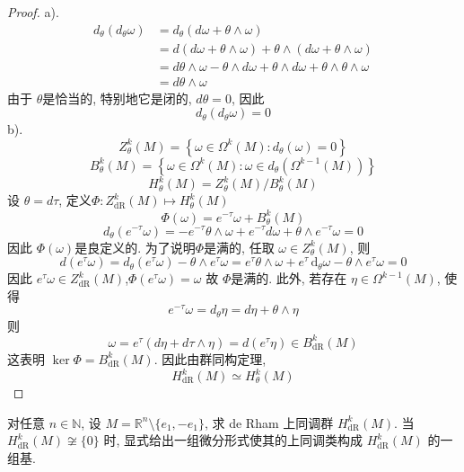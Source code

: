 \documentclass[../main.tex]{subfiles}
\begin{document}
\begin{proof}
a).
 $$ \begin{aligned} d _{\theta }\left( d _{\theta }\omega \right)&= d _{\theta } \left(d \omega + \theta \wedge \omega \right)\\&= d \left(d\omega + \theta \wedge \omega \right)+ \theta \wedge \left(d\omega + \theta \wedge \omega \right) \\&= d\theta \wedge \omega - \theta \wedge d\omega +  \theta \wedge d\omega + \theta \wedge \theta \wedge \omega\\&= d\theta \wedge \omega  \end{aligned} $$
由于 $\theta$是恰当的, 特别地它是闭的,  $d\theta = 0$, 因此
 $$ d _{\theta }\left(d _{\theta }\omega \right)= 0 $$
b).
 $$ Z_{\theta }^{k}\left(M\right)= \left\{ \omega \in \Omega ^{k}\left(M\right): d _{\theta }\left(\omega \right)= 0 \right\} $$
 $$ B_{\theta }^{k}\left(M\right)= \left\{ \omega \in \Omega ^{k}\left(M\right): \omega \in d _{\theta } \left(\Omega ^{k-1}\left(M\right)\right) \right\} $$
 $$ H_{\theta }^{k}\left(M\right)=  Z_{\theta }^{k}\left(M\right)/ B_{\theta }^{k}\left(M\right) $$
  设 $\theta = d\tau$, 定义$\Phi :Z_{\mathrm{dR}}^{k}\left(M\right)\mapsto H_{\theta }^{k}\left(M\right)$
 $$ \Phi \left(\omega  \right)= e^{-\tau }\omega +  B_{\theta }^{k}\left(M\right) $$
  $$ d _{\theta }\left(e^{-\tau }\omega \right)= -e^{-\tau }\theta \wedge \omega + e^{-\tau }d\omega + \theta \wedge e^{-\tau }\omega = 0 $$
因此 $\Phi \left(\omega \right)$是良定义的.
为了说明$\Phi$是满的, 任取 $\omega\in Z_{\theta }^{k}\left(M\right)$, 则
 $$ d\left(e^{\tau }\omega\right)= d _{\theta }\left(e^{\tau }\omega \right)-\theta \wedge e^{\tau }\omega = e^{\tau }\theta \wedge \omega + e^{\tau }\,\mathrm{d} _{\theta }\omega -\theta \wedge e^{\tau }\omega = 0  $$
因此 $e^{\tau }\omega \in Z_{\mathrm{dR}}^{k}\left(M\right)$,$\Phi \left(e^{\tau }\omega \right)=\omega$ 故 $\Phi$是满的.
  此外, 若存在 $\eta  \in \Omega^{k-1}\left(M\right)$, 使得
 $$ e^{-\tau }\omega = d _{\theta }\eta = d  \eta +  \theta \wedge \eta  $$
则
 $$ \omega = e^{\tau }\left(d  \eta +  d \tau \wedge  \eta \right)= d \left(e^{\tau }\eta \right) \in B_{\mathrm{dR}}^{k}\left(M\right)$$
这表明 $\operatorname{ker}\Phi = B_{\mathrm{dR}}^{k}\left(M\right)$. 因此由群同构定理,
 $$ H_{\mathrm{dR}}^{k}\left(M\right)\simeq H_{\theta }^{k}\left(M\right) $$
\end{proof}
\begin{exercise}{}{}
对任意 $n\in\mathbb{N}$, 设 $M=\mathbb{R}^n\setminus\{e_1,-e_1\}$, 求 de Rham 上同调群 $H_{\operatorname{dR}}^k(M)$. 当 $H_{\operatorname{dR}}^k(M)\not\cong\{0\}$ 时, 显式给出一组微分形式使其的上同调类构成 $H_{\operatorname{dR}}^k(M)$ 的一组基.
\end{exercise}
\end{document}
